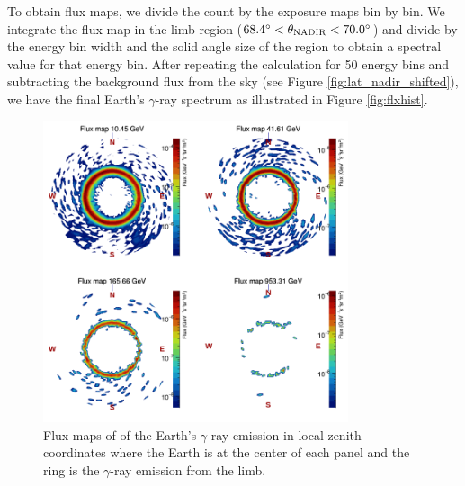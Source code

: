 To obtain flux maps, we divide the count by the exposure maps bin by bin.
We integrate the flux map in the limb region
($68.4^\circ<\theta_{\rm NADIR}<70.0^\circ$) and
divide by the energy bin width and the solid angle size of the region
to obtain a spectral value for that energy bin.
After repeating the calculation for 50 energy bins
and subtracting the background flux from the sky
(see Figure \ref{fig:lat_nadir_shifted}),
we have the final Earth's $\gamma$-ray spectrum as illustrated
in Figure \ref{fig:flxhist}.




\begin{figure}[h!]
    \centering
    \includegraphics[width=0.8\textwidth]{content/result_and_discussion/figures/zoom_rs/polar_flxmaps_with_label.png}
    \caption{
        Flux maps of of the Earth's $\gamma$-ray emission in
        local zenith coordinates where the Earth is at the center
        of each panel and the ring is the $\gamma$-ray emission
        from the limb.
    }
    \label{fig:flxmap_polar}
\end{figure}

